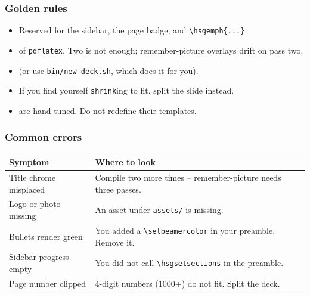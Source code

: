 \documentclass[aspectratio=169]{beamer}
\begin{document}
\begin{frame}[t]
  \frametitle{Golden rules}

  \begin{itemize}
    \setlength\itemsep{0.45em}
    \item {}
          Reserved for the sidebar, the page badge, and
          \texttt{\textbackslash hsgemph\{...\}}.
    \item {} of \texttt{pdflatex}. Two is not
          enough; remember-picture overlays drift on pass two.
    \item {} (or use \texttt{bin/new-deck.sh},
          which does it for you).
    \item {} If you find yourself
          \texttt{shrink}ing to fit, split the slide instead.
    \item {} are hand-tuned. Do not redefine
          their templates.
  \end{itemize}
\end{frame}

\begin{frame}[t]
  \frametitle{Common errors}

  \begin{tabular}{@{}p{4.4cm}p{8.6cm}@{}}
    \toprule
    \textbf{Symptom} & \textbf{Where to look} \\
    \midrule
    Title chrome misplaced &
      Compile two more times -- remember-picture needs three passes. \\[3pt]
    Logo or photo missing &
      An asset under \texttt{assets/} is missing. \\[3pt]
    Bullets render green &
      You added a \texttt{\textbackslash setbeamercolor} in your
      preamble. Remove it. \\[3pt]
    Sidebar progress empty &
      You did not call \texttt{\textbackslash hsgsetsections} in the
      preamble. \\[3pt]
    Page number clipped &
      4-digit numbers (1000+) do not fit. Split the deck. \\
    \bottomrule
  \end{tabular}
\end{frame}
\end{document}
